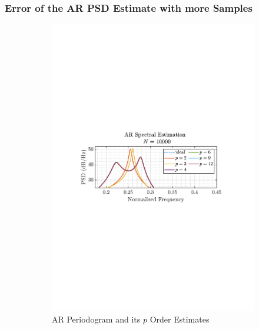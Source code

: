 \documentclass[12pt]{article}
\numberwithin{equation}{section}
\begin{document}
	\subsubsection{Error of the AR PSD Estimate with more Samples}
	\begin{figure}[H]
		\centering
		\begin{subfigure}{0.49\textwidth}
			\centering
			\includegraphics[trim={2.2cm 11.2cm 3.15cm  11.2cm}, clip, width=\textwidth]{../MATLAB/figures/q1_4c_fig14.pdf} 
			\captionsetup{justification=centering}
			\caption{AR Periodogram and its $p$ Order Estimates}
		\end{subfigure}
		\begin{subfigure}{0.49\textwidth}
			\centering

\end{subfigure}
\end{figure}
\end{document}
